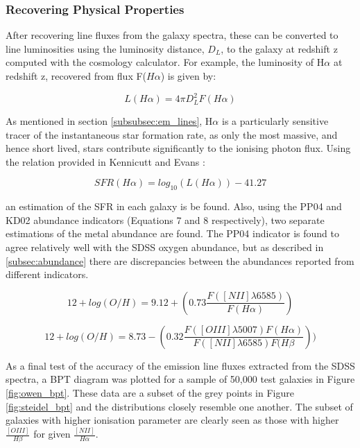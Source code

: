\documentclass{literature}
\begin{document}
\subsubsection{Recovering Physical Properties}
After recovering line fluxes from the galaxy spectra, these can be converted to line luminosities using the luminosity distance, $D_{L}$, to the galaxy at redshift z computed with the cosmology calculator. For example, the luminosity of H$\alpha$ at redshift z, recovered from flux F($H\alpha$) is given by: 

\begin{equation}
\label{eq:flux-lum}
 	L(H\alpha) = 4\pi D_{L}^{2} F(H\alpha)
\end{equation} 

As mentioned in section \ref{subsubsec:em_lines}, H$\alpha$ is a particularly sensitive tracer of the instantaneous star formation rate, as only the most massive, and hence short lived, stars contribute significantly to the ionising photon flux. Using the relation provided in Kennicutt and Evans \citep{Kennicutt_2012}: 

\begin{equation}
 	\label{eq:halpha_sfr}
 	SFR(H\alpha) = log_{10}(L(H\alpha)) - 41.27
 \end{equation} 

an estimation of the SFR in each galaxy is be found. Also, using the PP04 \citep{Pettini_2004} and KD02 \citep{Kewley2002} abundance indicators (Equations 7 and 8 respectively), two separate estimations of the metal abundance are found. The PP04 indicator is found to agree relatively well with the SDSS oxygen abundance, but as described in \ref{subsec:abundance} there are discrepancies between the abundances reported from different indicators.  

\begin{equation}
	\label{eq:PP04}
	12 + log(O/H) = 9.12 + (0.73\frac{F([NII]\lambda 6585)}{F(H\alpha)})
\end{equation}

\begin{equation}
	\label{eq:KD02}
	12 + log(O/H) = 8.73 - (0.32\frac{F([OIII]\lambda 5007)F(H\alpha)}{F([NII]\lambda 6585)F(H\beta}))	
\end{equation}

As a final test of the accuracy of the emission line fluxes extracted from the SDSS spectra, a BPT diagram was plotted for a sample of 50,000 test galaxies in Figure \ref{fig:owen_bpt}. These data are a subset of the grey points in Figure \ref{fig:steidel_bpt} and the distributions closely resemble one another. The subset of galaxies with higher ionisation parameter are clearly seen as those with higher $\frac{[OIII]}{H\beta}$ for given $\frac{[NII]}{H\alpha}$.
\end{document}
